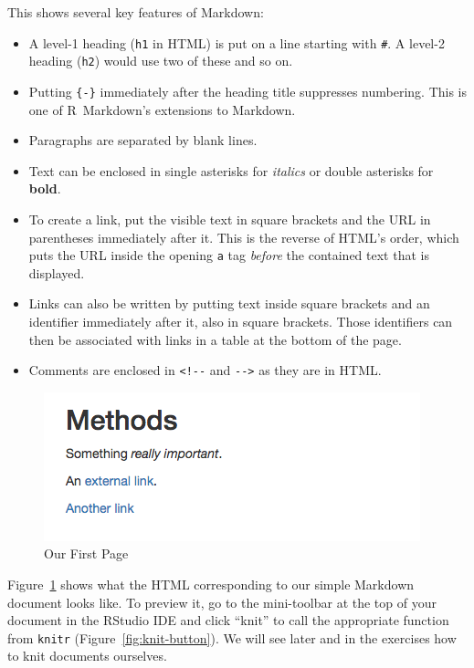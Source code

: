 This shows several key features of Markdown:

\begin{itemize}
\item
  A level-1 heading (\texttt{h1} in HTML) is put on a line starting with \texttt{\#}.
  A level-2 heading (\texttt{h2}) would use two of these and so on.
\item
  Putting \texttt{\{-\}} immediately after the heading title suppresses numbering.
  This is one of R~Markdown's extensions to Markdown.
\item
  Paragraphs are separated by blank lines.
\item
  Text can be enclosed in single asterisks for \emph{italics}
  or double asterisks for \textbf{bold}.
\item
  To create a link,
  put the visible text in square brackets
  and the URL in parentheses immediately after it.
  This is the reverse of HTML's order,
  which puts the URL inside the opening \texttt{a} tag
  \emph{before} the contained text that is displayed.
\item
  Links can also be written by putting text inside square brackets
  and an identifier immediately after it,
  also in square brackets.
  Those identifiers can then be associated with links in a table at the bottom of the page.
\item
  Comments are enclosed in \texttt{{\textless}!-{}-} and \texttt{-{}-{\textgreater}} as they are in HTML.
\end{itemize}

\begin{figure}[h]
  \includegraphics{figures/rmarkdown/first-page.png}
  \caption{Our First Page}
  \label{fig:first-page}
\end{figure}

Figure~\ref{fig:first-page} shows what the HTML corresponding to our simple Markdown document looks like.
To preview it,
go to the mini-toolbar at the top of your document in the RStudio IDE
and click ``knit''
to call the appropriate function from \texttt{knitr}
(Figure~\ref{fig:knit-button}).
We will see later and in the exercises how to knit documents ourselves.

